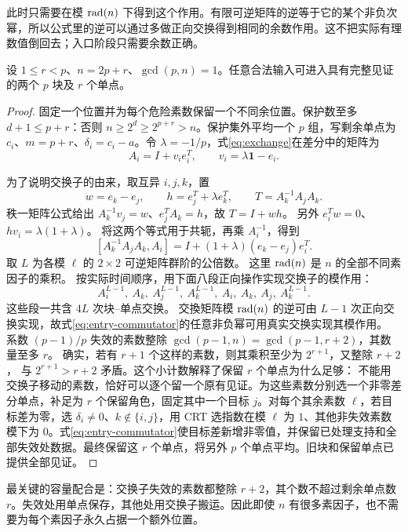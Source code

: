 此时只需要在模 $\operatorname{rad}(n)$ 下得到这个作用。有限可逆矩阵的逆等于它的某个非负次幂，所以公式里的逆可以通过多做正向交换得到相同的余数作用。这不把实际有理数值倒回去；入口阶段只需要余数正确。
\begin{lemma}[保留见证的双块入口]\label{lem:two-block-entry}
设 $1\le r<p$、$n=2p+r$、$\gcd(p,n)=1$。任意合法输入可进入具有完整见证的两个 $p$ 块及 $r$ 个单点。
\end{lemma}
\begin{proof}
固定一个位置并为每个危险素数保留一个不同余位置。保护数至多 $d+1\le p+r$：否则 $n\ge2^d\ge2^{p+r}>n$。保护集外平均一个 $p$ 组，写剩余单点为 $c_i$、$m=p+r$、$\delta_i=c_i-a$。令 $\lambda=-1/p$，式\eqref{eq:exchange}在差分中的矩阵为
\[
A_i=I+v_i e_i^T,\qquad v_i=\lambda\mathbf1-e_i.
\]

为了说明交换子的由来，取互异 $i,j,k$，置
\[
w=e_k-e_j,\qquad h=e_j^T+\lambda e_k^T,
\qquad T=A_k^{-1}A_jA_k.
\]
秩一矩阵公式给出 $A_k^{-1}v_j=w$、$e_j^TA_k=h$，故 $T=I+wh$。
另外 $e_i^Tw=0$、$hv_i=\lambda(1+\lambda)$。
将这两个等式用于共轭，再乘 $A_i^{-1}$，得到
\begin{equation}\label{eq:entry-commutator}
[A_k^{-1}A_jA_k,A_i]
=I+(1+\lambda)(e_k-e_j)e_i^T.
\end{equation}
取 $L$ 为各模 $\ell$ 的 $2\times2$ 可逆矩阵群阶的公倍数。
这里 $\operatorname{rad}(n)$ 是 $n$ 的全部不同素因子的乘积。
按实际时间顺序，用下面八段正向操作实现交换子的模作用：
\[
 A_i^{L-1},\ A_k,\ A_j^{L-1},\ A_k^{L-1},\
 A_i,\ A_k,\ A_j,\ A_k^{L-1}.
\]
这些段一共含 $4L$ 次块--单点交换。
交換矩阵模 $\operatorname{rad}(n)$ 的逆可由 $L-1$ 次正向交换实现，故式\eqref{eq:entry-commutator}的任意非负幂可用真实交换实现其模作用。
系数 $(p-1)/p$ 失效的素数整除 $\gcd(p-1,n)=\gcd(p-1,r+2)$，其数量至多 $r$。
确实，若有 $r+1$ 个这样的素数，则其乘积至少为 $2^{r+1}$，又整除 $r+2$，
与 $2^{r+1}>r+2$ 矛盾。这个小计数解释了保留 $r$ 个单点为什么足够：
不能用交换子移动的素数，恰好可以逐个留一个原有见证。为这些素数分别选一个非零差分单点，补足为 $r$ 个保留角色，固定其中一个目标 $j$。对每个其余素数 $\ell$，若目标差为零，选 $\delta_i\ne0$、$k\notin\{i,j\}$，用 CRT 选指数在模 $\ell$ 为 $1$、其他非失效素数模下为 $0$。式\eqref{eq:entry-commutator}使目标差新增非零值，并保留已处理支持和全部失效处数据。最终保留这 $r$ 个单点，将另外 $p$ 个单点平均。旧块和保留单点已提供全部见证。
\end{proof}
最关键的容量配合是：交换子失效的素数都整除 $r+2$，其个数不超过剩余单点数 $r$。失效处用单点保存，其他处用交换子搬运。因此即使 $n$ 有很多素因子，也不需要为每个素因子永久占据一个额外位置。

